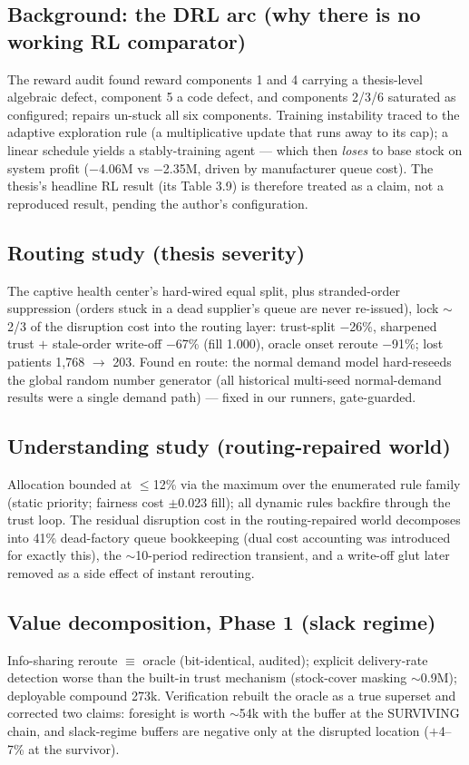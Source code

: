 \documentclass[11pt]{article}
\begin{document}
\subsection{Background: the DRL arc (why there is no working RL comparator)}
The reward audit found reward components 1 and 4 carrying a thesis-level algebraic
defect, component 5 a code defect, and components 2/3/6 saturated as configured; repairs
un-stuck all six components. Training instability traced to the adaptive exploration
rule (a multiplicative update that runs away to its cap); a linear schedule yields a
stably-training agent --- which then \emph{loses} to base stock on system profit
($-$4.06M vs $-$2.35M, driven by manufacturer queue cost). The thesis's headline RL
result (its Table 3.9) is therefore treated as a claim, not a reproduced result, pending
the author's configuration.

\subsection{Routing study (thesis severity)}
The captive health center's hard-wired equal split, plus stranded-order suppression
(orders stuck in a dead supplier's queue are never re-issued), lock $\sim$2/3 of the
disruption cost into the routing layer: trust-split $-$26\%, sharpened trust $+$
stale-order write-off $-$67\% (fill 1.000), oracle onset reroute $-$91\%; lost patients
1,768 $\to$ 203. Found en route: the normal demand model hard-reseeds the global random
number generator (all historical multi-seed normal-demand results were a single demand
path) --- fixed in our runners, gate-guarded.

\subsection{Understanding study (routing-repaired world)}
Allocation bounded at $\le$12\% via the maximum over the enumerated rule family (static
priority; fairness cost $\pm$0.023 fill); all dynamic rules backfire through the trust
loop. The residual disruption cost in the routing-repaired world decomposes into 41\%
dead-factory queue bookkeeping (dual cost accounting was introduced for exactly this),
the $\sim$10-period redirection transient, and a write-off glut later removed as a side
effect of instant rerouting.

\subsection{Value decomposition, Phase 1 (slack regime)}
Info-sharing reroute $\equiv$ oracle (bit-identical, audited); explicit delivery-rate
detection worse than the built-in trust mechanism (stock-cover masking $\sim$0.9M);
deployable compound 273k. Verification rebuilt the oracle as a true superset and corrected
two claims: foresight is worth $\sim$54k with the buffer at the SURVIVING chain, and
slack-regime buffers are negative only at the disrupted location ($+$4--7\% at the
survivor).
\end{document}
